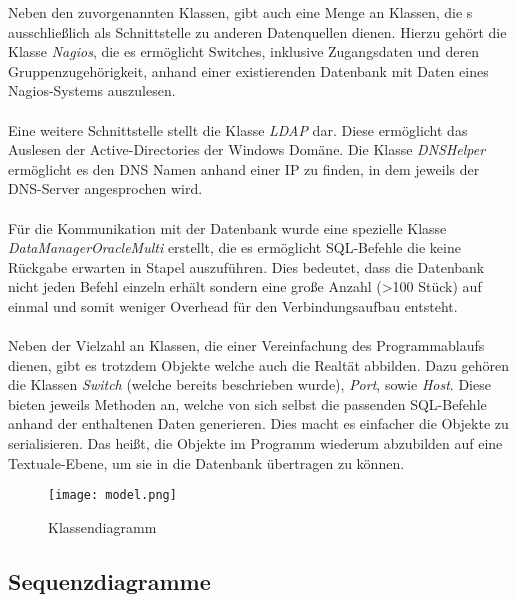 Neben den zuvorgenannten Klassen, gibt auch eine Menge an Klassen, die s ausschließlich als Schnittstelle zu anderen Datenquellen dienen.
Hierzu gehört die Klasse \textit{Nagios}, die es ermöglicht Switches, inklusive Zugangsdaten und deren Gruppenzugehörigkeit, anhand einer existierenden Datenbank mit Daten eines Nagios-Systems auszulesen.\\\\
Eine weitere Schnittstelle stellt die Klasse \textit{LDAP} dar. Diese ermöglicht das Auslesen der Active-Directories der Windows Domäne.
Die Klasse \textit{DNSHelper} ermöglicht es den DNS Namen anhand einer IP zu finden, in dem jeweils der DNS-Server angesprochen wird.\\\\
Für die Kommunikation mit der Datenbank wurde eine spezielle Klasse \textit{DataManagerOracleMulti} erstellt, die es ermöglicht SQL-Befehle die keine Rückgabe erwarten in Stapel auszuführen.
Dies bedeutet, dass die Datenbank nicht jeden Befehl einzeln erhält sondern eine große Anzahl (>100 Stück) auf einmal und somit weniger Overhead für den Verbindungsaufbau entsteht.\\\\
Neben der Vielzahl an Klassen, die einer Vereinfachung des Programmablaufs dienen, gibt es trotzdem Objekte welche auch die Realtät abbilden.
Dazu gehören die Klassen \textit{Switch} (welche bereits beschrieben wurde), \textit{Port}, sowie \textit{Host}.
Diese bieten jeweils Methoden an, welche von sich selbst die passenden SQL-Befehle anhand der enthaltenen Daten generieren. Dies macht es einfacher die Objekte zu serialisieren.
Das heißt, die Objekte im Programm wiederum abzubilden auf eine Textuale-Ebene, um sie in die Datenbank übertragen zu können.\\

\begin{figure}[H]
\centering
\texttt{[image: model.png]}
\caption{Klassendiagramm}
\label{fig:classdiagram}
\end{figure}

\subsection{Sequenzdiagramme}
\label{subsec:seqdiagrams}

